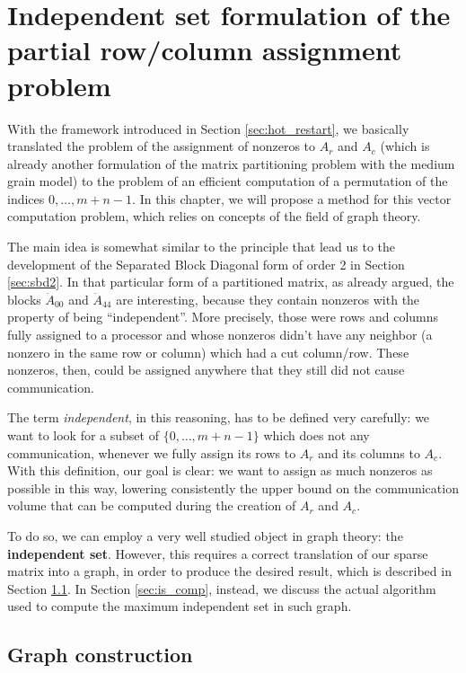 \chapter{Independent set formulation of the partial row/column assignment problem} \label{chap:independent_set}

With the framework introduced in Section \ref{sec:hot_restart}, we basically translated the problem of the assignment of nonzeros to $A_r$ and $A_c$ (which is already another formulation of the matrix partitioning problem with the medium grain model) to the problem of an efficient computation of a permutation of the indices $0,\dots,m+n-1$. In this chapter, we will propose a method for this vector computation problem, which relies on concepts of the field of graph theory.

The main idea is somewhat similar to the principle that lead us to the development of the Separated Block Diagonal form of order 2 in Section \ref{sec:sbd2}. In that particular form of a partitioned matrix, as already argued, the blocks $\ddot{A}_{00}$ and $\ddot{A}_{44}$ are interesting, because they contain nonzeros with the property of being ``independent''. More precisely, those were rows and columns fully assigned to a processor and whose nonzeros didn't have any neighbor (a nonzero in the same row or column) which had a cut column/row. These nonzeros, then, could be assigned anywhere that they still did not cause communication.

The term \emph{independent}, in this reasoning, has to be defined very carefully: we want to look for a subset of $\{0,\dots,m+n-1\}$ which does not any communication, whenever we fully assign its rows to $A_r$ and its columns to $A_c$. With this definition, our goal is clear: we want to assign as much nonzeros as possible in this way, lowering consistently the upper bound on the communication volume that can be computed during the creation of $A_r$ and $A_c$.

To do so, we can employ a very well studied object in graph theory: the \textbf{independent set}. However, this requires a correct translation of our sparse matrix into a graph, in order to produce the desired result, which is described in Section \ref{sec:is_graph}. In Section \ref{sec:is_comp}, instead, we discuss the actual algorithm used to compute the maximum independent set in such graph.

\section{Graph construction} \label{sec:is_graph}

